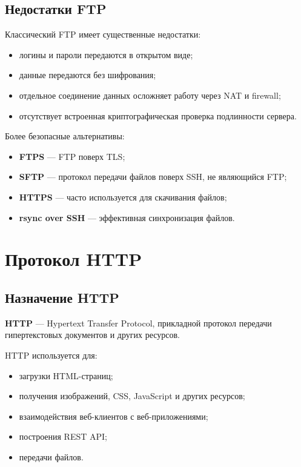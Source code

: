\documentclass[12pt,a4paper]{article}
\begin{document}
\subsection{Недостатки FTP}

Классический FTP имеет существенные недостатки:
\begin{itemize}
    \item логины и пароли передаются в открытом виде;
    \item данные передаются без шифрования;
    \item отдельное соединение данных осложняет работу через NAT и firewall;
    \item отсутствует встроенная криптографическая проверка подлинности сервера.
\end{itemize}

Более безопасные альтернативы:
\begin{itemize}
    \item \textbf{FTPS} --- FTP поверх TLS;
    \item \textbf{SFTP} --- протокол передачи файлов поверх SSH, не являющийся FTP;
    \item \textbf{HTTPS} --- часто используется для скачивания файлов;
    \item \textbf{rsync over SSH} --- эффективная синхронизация файлов.
\end{itemize}

\section{Протокол HTTP}

\subsection{Назначение HTTP}

\textbf{HTTP} --- Hypertext Transfer Protocol, прикладной протокол передачи гипертекстовых документов и других ресурсов.

HTTP используется для:
\begin{itemize}
    \item загрузки HTML-страниц;
    \item получения изображений, CSS, JavaScript и других ресурсов;
    \item взаимодействия веб-клиентов с веб-приложениями;
    \item построения REST API;
    \item передачи файлов.
\end{itemize}
\end{document}
